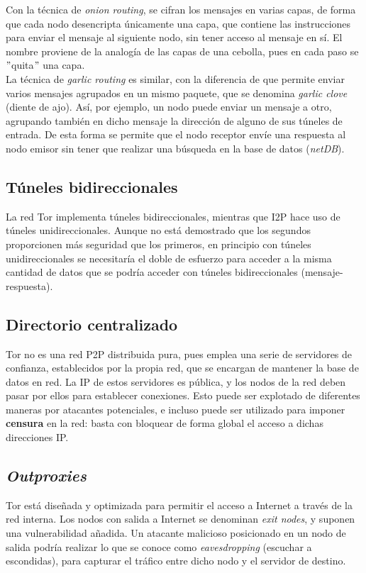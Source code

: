    Con la técnica de \textit{onion routing}, se cifran los mensajes en varias capas, de forma que cada nodo desencripta únicamente una capa, que contiene las instrucciones para enviar el mensaje al siguiente nodo, sin tener acceso al mensaje en sí. El nombre proviene de la analogía de las capas de una cebolla, pues en cada paso se $"$quita$"$ una capa.\\
    
    
 La técnica de \textit{garlic routing} es similar, con la diferencia de que permite enviar varios mensajes agrupados en un mismo paquete, que se denomina \textit{garlic clove} (diente de ajo). Así, por ejemplo, un nodo puede enviar un mensaje a otro, agrupando también en dicho mensaje la dirección de alguno de sus túneles de entrada. De esta forma se permite que el nodo receptor envíe una respuesta al nodo emisor sin tener que realizar una búsqueda en la base de datos (\textit{netDB}).
 
 \subsection{Túneles bidireccionales}
 
 La red Tor implementa túneles bidireccionales, mientras que I2P hace uso de túneles unidireccionales. Aunque no está demostrado que los segundos proporcionen más seguridad que los primeros, en principio con túneles unidireccionales se necesitaría el doble de esfuerzo para acceder a la misma cantidad de datos que se podría acceder con túneles bidireccionales (mensaje-respuesta).
    
 \subsection{Directorio centralizado}
    Tor no es una red P2P distribuida pura, pues emplea una serie de servidores de confianza, establecidos por la propia red, que se encargan de mantener la base de datos en red. La IP de estos servidores es pública, y los nodos de la red deben pasar por ellos para establecer conexiones. Esto puede ser explotado de diferentes maneras por atacantes potenciales, e incluso puede ser utilizado para imponer \textbf{censura} en la red: basta con bloquear de forma global el acceso a dichas direcciones IP.
    
    \subsection{\textit{Outproxies}}
   Tor está diseñada y optimizada para permitir el acceso a Internet a través de la red interna. Los nodos con salida a Internet se denominan \textit{exit nodes}, y suponen una vulnerabilidad añadida. Un atacante malicioso posicionado en un nodo de salida podría realizar lo que se conoce como \textit{eavesdropping} (escuchar a escondidas), para capturar el tráfico entre dicho nodo y el servidor de destino.\\
   
